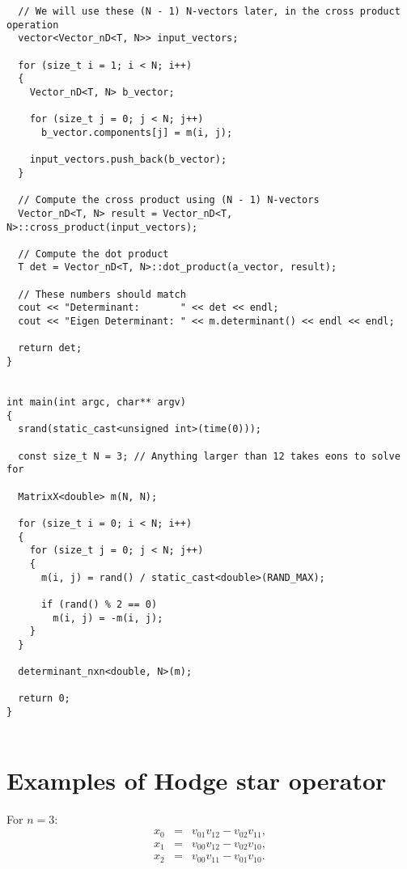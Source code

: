 \documentclass[12pt]{article}
\begin{document}
\begin{lstlisting}
  // We will use these (N - 1) N-vectors later, in the cross product operation
  vector<Vector_nD<T, N>> input_vectors;

  for (size_t i = 1; i < N; i++)
  {
    Vector_nD<T, N> b_vector;

    for (size_t j = 0; j < N; j++)
      b_vector.components[j] = m(i, j);

    input_vectors.push_back(b_vector);
  }

  // Compute the cross product using (N - 1) N-vectors
  Vector_nD<T, N> result = Vector_nD<T, N>::cross_product(input_vectors);

  // Compute the dot product
  T det = Vector_nD<T, N>::dot_product(a_vector, result);

  // These numbers should match
  cout << "Determinant:       " << det << endl;
  cout << "Eigen Determinant: " << m.determinant() << endl << endl;

  return det;
}


int main(int argc, char** argv)
{
  srand(static_cast<unsigned int>(time(0)));

  const size_t N = 3; // Anything larger than 12 takes eons to solve for

  MatrixX<double> m(N, N);

  for (size_t i = 0; i < N; i++)
  {
    for (size_t j = 0; j < N; j++)
    {
      m(i, j) = rand() / static_cast<double>(RAND_MAX);

      if (rand() % 2 == 0)
        m(i, j) = -m(i, j);
    }
  }

  determinant_nxn<double, N>(m);

  return 0;
}


\end{lstlisting}



\section{Examples of Hodge star operator}

For $n = 3$:
\begin{eqnarray}
x_{0} &=& v_{01} v_{12} - v_{02} v_{11},\\
x_{1} &=& v_{00} v_{12} - v_{02} v_{10},\\
x_{2} &=& v_{00} v_{11} - v_{01} v_{10}.
\end{eqnarray}
\end{document}
